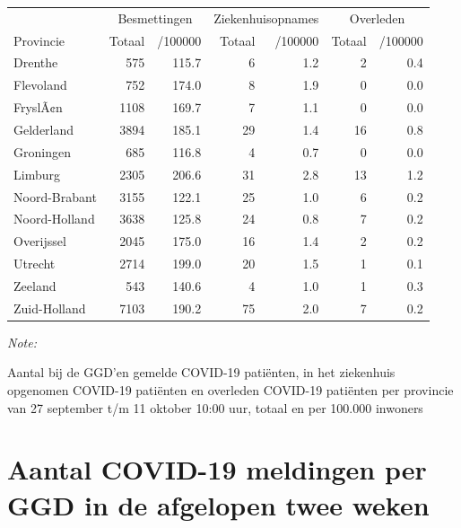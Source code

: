 \documentclass[
  english,
  man,floatsintext]{apa6}
\begin{document}
\begin{table}
\centering
\begin{threeparttable}
\begin{tabular}{lrrrrrr}
\toprule
\multicolumn{1}{c}{ } & \multicolumn{2}{c}{Besmettingen} & \multicolumn{2}{c}{Ziekenhuisopnames} & \multicolumn{2}{c}{Overleden} \\
\cmidrule(l{3pt}r{3pt}){2-3} \cmidrule(l{3pt}r{3pt}){4-5} \cmidrule(l{3pt}r{3pt}){6-7}
Provincie & Totaal & /100000 & Totaal & /100000 & Totaal & /100000\\
\midrule
Drenthe & 575 & 115.7 & 6 & 1.2 & 2 & 0.4\\
Flevoland & 752 & 174.0 & 8 & 1.9 & 0 & 0.0\\
FryslÃ¢n & 1108 & 169.7 & 7 & 1.1 & 0 & 0.0\\
Gelderland & 3894 & 185.1 & 29 & 1.4 & 16 & 0.8\\
Groningen & 685 & 116.8 & 4 & 0.7 & 0 & 0.0\\
Limburg & 2305 & 206.6 & 31 & 2.8 & 13 & 1.2\\
Noord-Brabant & 3155 & 122.1 & 25 & 1.0 & 6 & 0.2\\
Noord-Holland & 3638 & 125.8 & 24 & 0.8 & 7 & 0.2\\
Overijssel & 2045 & 175.0 & 16 & 1.4 & 2 & 0.2\\
Utrecht & 2714 & 199.0 & 20 & 1.5 & 1 & 0.1\\
Zeeland & 543 & 140.6 & 4 & 1.0 & 1 & 0.3\\
Zuid-Holland & 7103 & 190.2 & 75 & 2.0 & 7 & 0.2\\
\bottomrule
\end{tabular}
\begin{tablenotes}
\item \textit{Note: } 
\item Aantal bij de GGD’en gemelde COVID-19 patiënten, in het ziekenhuis opgenomen COVID-19 patiënten en overleden COVID-19 patiënten per provincie van 27 september t/m 11 oktober 10:00 uur, totaal en per 100.000 inwoners
\end{tablenotes}
\end{threeparttable}
\end{table}

\newpage

\hypertarget{aantal-covid-19-meldingen-per-ggd-in-de-afgelopen-twee-weken}{%
\section{Aantal COVID-19 meldingen per GGD in de afgelopen twee weken}\label{aantal-covid-19-meldingen-per-ggd-in-de-afgelopen-twee-weken}}
\end{document}
